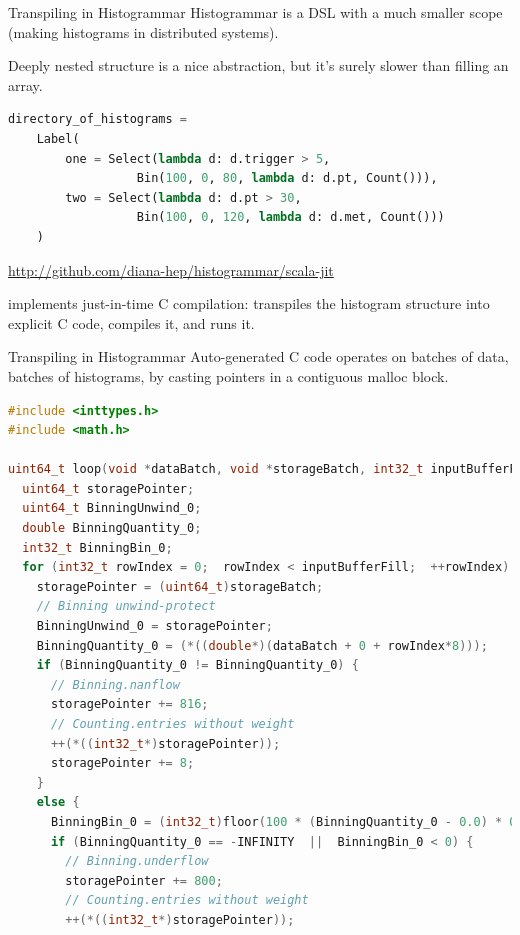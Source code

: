 \documentclass{beamer}
\begin{document}
\begin{frame}[fragile]{Transpiling in Histogrammar}
\vfill
Histogrammar is a DSL with a much smaller scope (making histograms in distributed systems).

\vfill
Deeply nested structure is a nice abstraction, but it's surely slower than filling an array.

\begin{lstlisting}[language=python, basicstyle=\ttfamily\scriptsize]
directory_of_histograms =
    Label(
        one = Select(lambda d: d.trigger > 5,
                  Bin(100, 0, 80, lambda d: d.pt, Count())),
        two = Select(lambda d: d.pt > 30,
                  Bin(100, 0, 120, lambda d: d.met, Count()))
    )
\end{lstlisting}

\vfill
\textcolor{blue}{\small \url{http://github.com/diana-hep/histogrammar/scala-jit}}

implements just-in-time C compilation: transpiles the histogram structure into explicit C code, compiles it, and runs it.
\end{frame}

\begin{frame}[fragile]{Transpiling in Histogrammar}
\vspace{0.3 cm}
Auto-generated C code operates on batches of data, batches of histograms, by casting pointers in a contiguous malloc block.

\vfill
\begin{lstlisting}[language=c, basicstyle=\ttfamily\tiny]
#include <inttypes.h>
#include <math.h>

uint64_t loop(void *dataBatch, void *storageBatch, int32_t inputBufferFill) {
  uint64_t storagePointer;
  uint64_t BinningUnwind_0;
  double BinningQuantity_0;
  int32_t BinningBin_0;
  for (int32_t rowIndex = 0;  rowIndex < inputBufferFill;  ++rowIndex) {
    storagePointer = (uint64_t)storageBatch;
    // Binning unwind-protect
    BinningUnwind_0 = storagePointer;
    BinningQuantity_0 = (*((double*)(dataBatch + 0 + rowIndex*8)));
    if (BinningQuantity_0 != BinningQuantity_0) {
      // Binning.nanflow
      storagePointer += 816;
      // Counting.entries without weight
      ++(*((int32_t*)storagePointer));
      storagePointer += 8;
    }
    else {
      BinningBin_0 = (int32_t)floor(100 * (BinningQuantity_0 - 0.0) * 0.0125);
      if (BinningQuantity_0 == -INFINITY  ||  BinningBin_0 < 0) {
        // Binning.underflow
        storagePointer += 800;
        // Counting.entries without weight
        ++(*((int32_t*)storagePointer));
\end{lstlisting}
\end{frame}
\end{document}
